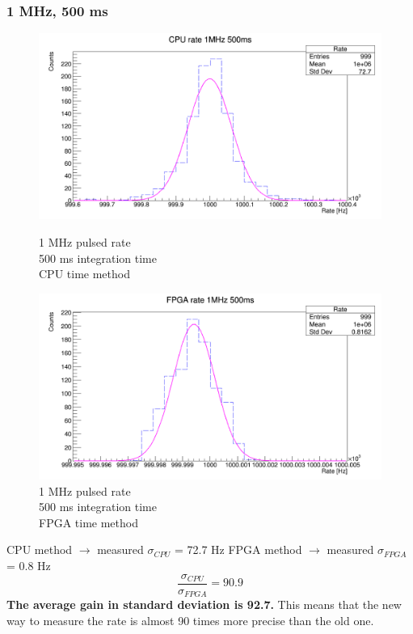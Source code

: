 \subsubsection{1 MHz, 500 ms}
\begin{figure}[H]
	\centering
	\begin{minipage}{0.49\textwidth}
		\centering
		\includegraphics[width=.99\linewidth]{IMG/ch5/RateMeasures/CPU-time-rate-1MHz-500ms}
		\caption{1 MHz pulsed rate\\500 ms integration time\\CPU time method}
		\label{fig:CPU-time-rate-1MHz-500ms}
	\end{minipage}%
	\begin{minipage}{0.49\textwidth}
		\centering
		\includegraphics[width=.99\linewidth]{IMG/ch5/RateMeasures/FPGA-time-rate-1MHz-500ms}
		\caption{1 MHz pulsed rate\\500 ms integration time\\FPGA time method}
		\label{fig:FPGA-time-rate-1MHz-500ms}
	\end{minipage}
\end{figure}
\noindent CPU method $\rightarrow$ measured $\sigma_{CPU}$ = 72.7 Hz
\newline
FPGA method $\rightarrow$ measured $\sigma_{FPGA}$ = 0.8 Hz
\begin{equation}
	\frac{\sigma_{CPU}}{\sigma_{FPGA}} = 90.9
\end{equation}
\newline
\noindent \textbf{The average gain in standard deviation is 92.7.}
\newline
This means that the new way to measure the rate is almost 90 times more precise than the old one.

